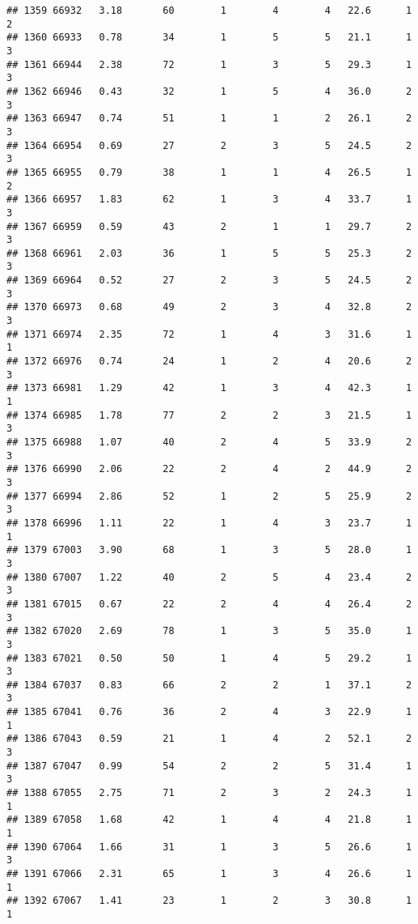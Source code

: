 \documentclass[
]{article}
\begin{document}
\begin{verbatim}
## 1359 66932   3.18       60        1        4        4   22.6      1      2
## 1360 66933   0.78       34        1        5        5   21.1      1      3
## 1361 66944   2.38       72        1        3        5   29.3      1      3
## 1362 66946   0.43       32        1        5        4   36.0      2      3
## 1363 66947   0.74       51        1        1        2   26.1      2      3
## 1364 66954   0.69       27        2        3        5   24.5      2      3
## 1365 66955   0.79       38        1        1        4   26.5      1      2
## 1366 66957   1.83       62        1        3        4   33.7      1      3
## 1367 66959   0.59       43        2        1        1   29.7      2      3
## 1368 66961   2.03       36        1        5        5   25.3      2      3
## 1369 66964   0.52       27        2        3        5   24.5      2      3
## 1370 66973   0.68       49        2        3        4   32.8      2      3
## 1371 66974   2.35       72        1        4        3   31.6      1      1
## 1372 66976   0.74       24        1        2        4   20.6      2      3
## 1373 66981   1.29       42        1        3        4   42.3      1      1
## 1374 66985   1.78       77        2        2        3   21.5      1      3
## 1375 66988   1.07       40        2        4        5   33.9      2      3
## 1376 66990   2.06       22        2        4        2   44.9      2      3
## 1377 66994   2.86       52        1        2        5   25.9      2      3
## 1378 66996   1.11       22        1        4        3   23.7      1      1
## 1379 67003   3.90       68        1        3        5   28.0      1      3
## 1380 67007   1.22       40        2        5        4   23.4      2      3
## 1381 67015   0.67       22        2        4        4   26.4      2      3
## 1382 67020   2.69       78        1        3        5   35.0      1      3
## 1383 67021   0.50       50        1        4        5   29.2      1      3
## 1384 67037   0.83       66        2        2        1   37.1      2      3
## 1385 67041   0.76       36        2        4        3   22.9      1      1
## 1386 67043   0.59       21        1        4        2   52.1      2      3
## 1387 67047   0.99       54        2        2        5   31.4      1      3
## 1388 67055   2.75       71        2        3        2   24.3      1      1
## 1389 67058   1.68       42        1        4        4   21.8      1      1
## 1390 67064   1.66       31        1        3        5   26.6      1      3
## 1391 67066   2.31       65        1        3        4   26.6      1      1
## 1392 67067   1.41       23        1        2        3   30.8      1      1

\end{verbatim}
\end{document}
